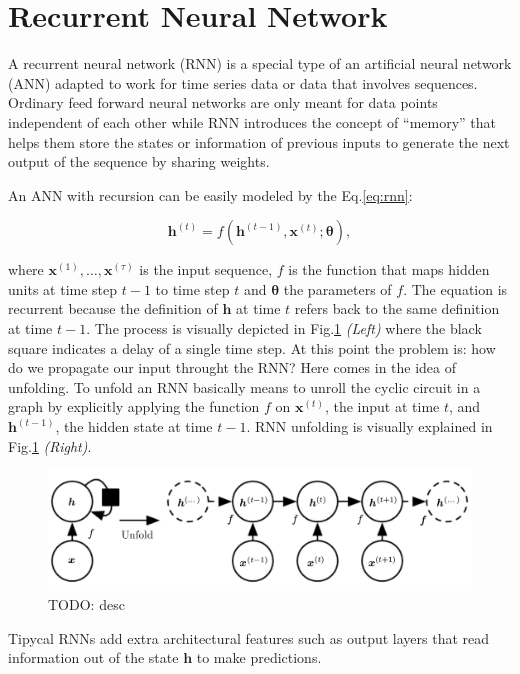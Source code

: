\section{Recurrent Neural Network}

A recurrent neural network (RNN) is a special type of an artificial
neural network (ANN) adapted to work for time series data or data that
involves sequences. Ordinary feed forward neural networks are only
meant for data points independent of each other while RNN introduces
the concept of ``memory'' that helps them store the states or
information of previous inputs to generate the next output of the
sequence by sharing weights.

An ANN with recursion can be easily modeled by the Eq.\ref{eq:rnn}:

\begin{equation}
  \label{eq:rnn}
  \bm{h}^{(t)} = f ( \bm{h}^{(t - 1)}, \bm{x}^{(t)} ; \bm{\theta} ),
\end{equation}

where $\bm{x}^{(1)}, \ldots, \bm{x}^{(\tau)}$ is the input sequence,
$f$ is the function that maps hidden units at time step $t - 1$ to
time step $t$ and $\bm{\theta}$ the parameters of $f$. The equation is
recurrent because the deﬁnition of $\bm{h}$ at time $t$ refers back to
the same deﬁnition at time $t - 1$. The process is visually depicted
in Fig.\ref{fig:rnn-with-unfold} \emph{(Left)} where the black square
indicates a delay of a single time step. At this point the problem is:
how do we propagate our input throught the RNN? Here comes in the idea
of unfolding. To unfold an RNN basically means to unroll the cyclic
circuit in a graph by explicitly applying the function $f$ on
$\bm{x}^{(t)}$, the input at time $t$, and $\bm{h}^{(t-1)}$, the
hidden state at time $t - 1$. RNN unfolding is visually explained in
Fig.\ref{fig:rnn-with-unfold} \emph{(Right)}.

\begin{figure}
  \centering
  \includegraphics[width=.8\textwidth]{figures/rnn-with-unfold.png}
  \caption[TODO]{TODO: desc}
  \label{fig:rnn-with-unfold}
\end{figure}

Tipycal RNNs add extra architectural features such as output layers
that read information out of the state $\bm{h}$ to make predictions.

